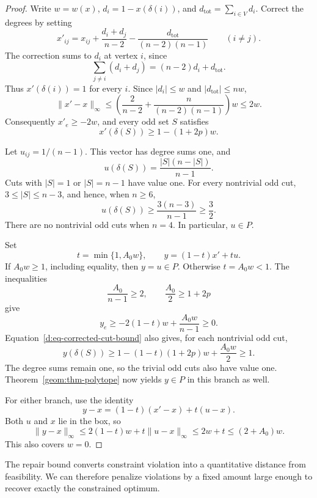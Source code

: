 \begin{proof}
Write \(w=w(x)\), \(d_i=1-x(\delta(i))\), and
\(d_{\mathrm{tot}}=\sum_{i\in V}d_i\).  Correct the degrees by setting
\begin{equation}
\label{d:eq-degree-correction}
x'_{ij}
=x_{ij}+\frac{d_i+d_j}{n-2}
          -\frac{d_{\mathrm{tot}}}{(n-2)(n-1)}
\qquad (i\ne j).
\end{equation}
The correction sums to \(d_i\) at vertex \(i\), since
\[
\sum_{j\ne i}(d_i+d_j)=(n-2)d_i+d_{\mathrm{tot}}.
\]
Thus \(x'(\delta(i))=1\) for every \(i\).  Since
\(|d_i|\le w\) and \(|d_{\mathrm{tot}}|\le nw\),
\[
\|x'-x\|_\infty
\le
\left(\frac{2}{n-2}+\frac{n}{(n-2)(n-1)}\right)w
\le 2w.
\]
Consequently \(x'_e\ge-2w\), and every odd set \(S\) satisfies
\begin{equation}
\label{d:eq-corrected-cut-bound}
x'(\delta(S))\ge 1-(1+2p)w.
\end{equation}

Let \(u_{ij}=1/(n-1)\).  This vector has degree sums one, and
\[
u(\delta(S))=\frac{|S|(n-|S|)}{n-1}.
\]
Cuts with \(|S|=1\) or \(|S|=n-1\) have value one.  For every nontrivial
odd cut, \(3\le |S|\le n-3\), and hence, when \(n\ge6\),
\[
u(\delta(S))\ge\frac{3(n-3)}{n-1}\ge\frac32.
\]
There are no nontrivial odd cuts when \(n=4\).  In particular, \(u\in P\).

Set
\begin{equation}
\label{d:eq-uniform-repair}
t=\min\{1,A_0w\},
\qquad
y=(1-t)x'+tu.
\end{equation}
If \(A_0w\ge1\), including equality, then \(y=u\in P\).
Otherwise \(t=A_0w<1\).  The inequalities
\[
\frac{A_0}{n-1}\ge2,
\qquad
\frac{A_0}{2}\ge1+2p
\]
give
\[
y_e\ge-2(1-t)w+\frac{A_0w}{n-1}\ge0.
\]
Equation~\eqref{d:eq-corrected-cut-bound} also gives, for each nontrivial
odd cut,
\[
y(\delta(S))
\ge 1-(1-t)(1+2p)w+\frac{A_0w}{2}
\ge1.
\]
The degree sums remain one, so the trivial odd cuts also have value one.
Theorem~\ref{geom:thm-polytope} now yields \(y\in P\) in this branch
as well.

For either branch, use the identity
\[
y-x=(1-t)(x'-x)+t(u-x).
\]
Both \(u\) and \(x\) lie in the box, so
\[
\|y-x\|_\infty
\le 2(1-t)w+t\|u-x\|_\infty
\le 2w+t
\le (2+A_0)w.
\]
This also covers \(w=0\).
\end{proof}

The repair bound converts constraint violation into a quantitative distance
from feasibility. We can therefore penalize violations by a fixed amount
large enough to recover exactly the constrained optimum.

